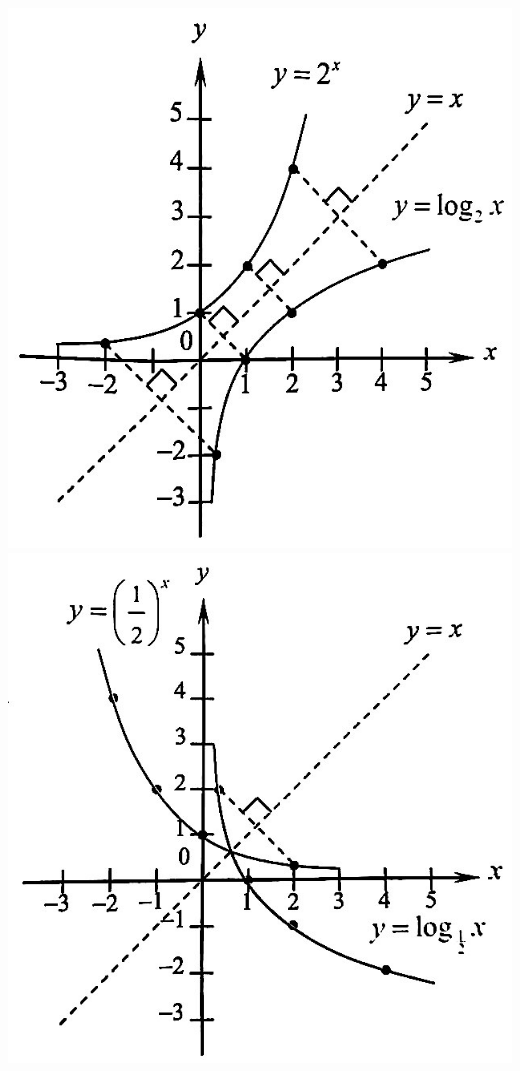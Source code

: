 \documentclass[12pt]{report}
\begin{document}
\begin{center}
    \includegraphics[scale=0.3]{./assets/log1.jpg}
    \hspace{1cm}
    \includegraphics[scale=0.3]{./assets/log2.jpg}
\end{center}
\end{document}
